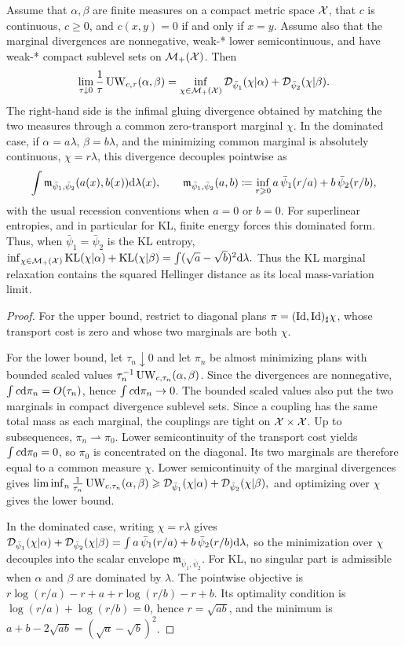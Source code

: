 \begin{prop}\label{prop-unbalanced-small-scale-limit}
Assume that $\alpha,\beta$ are finite measures on a compact metric space $\mathcal{X}$, that $c$ is continuous, $c\geq0$, and $c(x,y)=0$ if and only if $x=y$. Assume also that the marginal divergences are nonnegative, weak-* lower semicontinuous, and have weak-* compact sublevel sets on $\mathcal{M}_+(\mathcal{X})$. Then
\[
\lim_{\tau\downarrow0}\frac1\tau\operatorname{UW}_{c,\tau}(\alpha,\beta)
=
\inf_{\chi\in\mathcal{M}_+(\mathcal{X})}
\mathcal{D}_{\bar\psi_1}(\chi|\alpha)
+
\mathcal{D}_{\bar\psi_2}(\chi|\beta).
\]
The right-hand side is the infimal gluing divergence obtained by matching the two measures through a common zero-transport marginal $\chi$. In the dominated case, if $\alpha=a\lambda$, $\beta=b\lambda$, and the minimizing common marginal is absolutely continuous, $\chi=r\lambda$, this divergence decouples pointwise as
\[
\int \mathfrak m_{\bar\psi_1,\bar\psi_2}(a(x),b(x))\mathrm{d}\lambda(x),
\qquad
\mathfrak m_{\bar\psi_1,\bar\psi_2}(a,b)
\coloneqq
\inf_{r\geqslant0} a\,\bar\psi_1(r/a)+b\,\bar\psi_2(r/b),
\]
with the usual recession conventions when $a=0$ or $b=0$. For superlinear entropies, and in particular for KL, finite energy forces this dominated form. Thus, when $\bar\psi_1=\bar\psi_2$ is the KL entropy,
\(\inf_{\chi\in\mathcal{M}_+(\mathcal{X})} \operatorname{KL}(\chi|\alpha)+\operatorname{KL}(\chi|\beta) = \int (\sqrt{a}-\sqrt{b})^2\mathrm{d}\lambda.\)
Thus the KL marginal relaxation contains the squared Hellinger distance as its local mass-variation limit.
\end{prop}
\begin{proof}
For the upper bound, restrict to diagonal plans $\pi=(\mathrm{Id},\mathrm{Id})_\sharp\chi$, whose transport cost is zero and whose two marginals are both $\chi$.

For the lower bound, let $\tau_n\downarrow0$ and let $\pi_n$ be almost minimizing plans with bounded scaled values $\tau_n^{-1}\operatorname{UW}_{c,\tau_n}(\alpha,\beta)$. Since the divergences are nonnegative, $\int c\mathrm{d}\pi_n=O(\tau_n)$, hence $\int c\mathrm{d}\pi_n\to0$. The bounded scaled values also put the two marginals in compact divergence sublevel sets. Since a coupling has the same total mass as each marginal, the couplings are tight on $\mathcal{X}\times\mathcal{X}$. Up to subsequences, $\pi_n\rightharpoonup\pi_0$. Lower semicontinuity of the transport cost yields $\int c\mathrm{d}\pi_0=0$, so $\pi_0$ is concentrated on the diagonal. Its two marginals are therefore equal to a common measure $\chi$. Lower semicontinuity of the marginal divergences gives
\(\liminf_n\frac1{\tau_n}\operatorname{UW}_{c,\tau_n}(\alpha,\beta) \geqslant \mathcal{D}_{\bar\psi_1}(\chi|\alpha)+\mathcal{D}_{\bar\psi_2}(\chi|\beta),\)
and optimizing over $\chi$ gives the lower bound.

In the dominated case, writing $\chi=r\lambda$ gives \(\mathcal{D}_{\bar\psi_1}(\chi|\alpha)+\mathcal{D}_{\bar\psi_2}(\chi|\beta) = \int a\,\bar\psi_1(r/a)+b\,\bar\psi_2(r/b) \mathrm{d}\lambda,\)
so the minimization over $\chi$ decouples into the scalar envelope $\mathfrak m_{\bar\psi_1,\bar\psi_2}$. For KL, no singular part is admissible when $\alpha$ and $\beta$ are dominated by $\lambda$. The pointwise objective is $r\log(r/a)-r+a+r\log(r/b)-r+b$. Its optimality condition is $\log(r/a)+\log(r/b)=0$, hence $r=\sqrt{ab}$, and the minimum is $a+b-2\sqrt{ab}=(\sqrt a-\sqrt b)^2$.
\end{proof}
